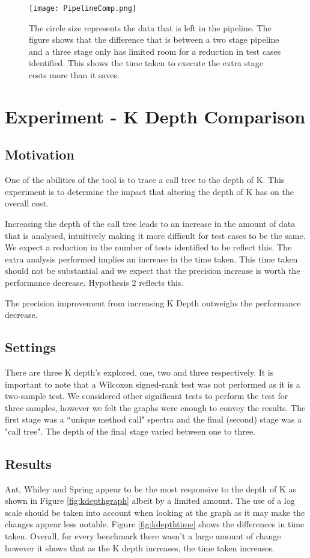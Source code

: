 \begin{figure}[h]
\centering
\texttt{[image: PipelineComp.png]}
\caption{The circle size represents the data that is left in the pipeline. The figure shows that the difference that is between a two stage pipeline and a three stage only has limited room for a reduction in test cases identified. This shows the time taken to execute the extra stage costs more than it saves.}
\label{fig:pipelinecomp}
\end{figure}

\section{Experiment  - K Depth Comparison}
\label{kdepthcomp}
\subsection{Motivation}
One of the abilities of the tool is to trace a call tree to the depth of K. This experiment is to determine the impact that altering the depth of K has on the overall cost. 

Increasing the depth of the call tree leads to an increase in the amount of data that is analysed, intuitively making it more difficult for test cases to be the same. We expect a reduction in the number of tests identified to be reflect this. The extra analysis performed implies an increase in the time taken. This time taken should not be substantial and we expect that the precision increase is worth the performance decrease. Hypothesis 2 reflects this.

\begin{hyp}
The precision improvement from increasing K Depth outweighs the performance decrease.
\end{hyp}

\subsection{Settings}
There are three K depth's explored, one, two and three respectively. It is important to note that a Wilcoxon signed-rank test was not performed as it is a two-sample test. We considered other significant tests to perform the test for three samples, however we felt the graphs were enough to convey the results. The first stage was a ``unique method call" spectra and the final (second) stage was a "call tree". The depth of the final stage varied between one to three.


\subsection{Results}
Ant, Whiley and Spring appear to be the most responsive to the depth of K as shown in Figure \ref{fig:kdepthgraph} albeit by a limited amount. The use of a log scale should be taken into account when looking at the graph as it may make the changes appear less notable. Figure \ref{fig:kdepthtime} shows the differences in time taken. Overall, for every benchmark there wasn't a large amount of change however it shows that as the K depth increases, the time taken increases. 

